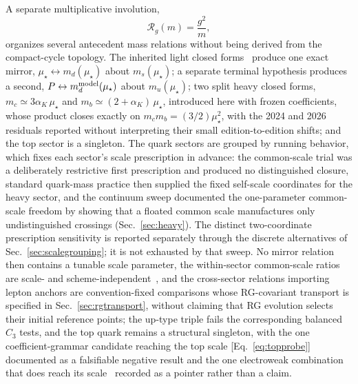 \documentclass[aps,twocolumn,superscriptaddress,nofootinbib,floatfix]{revtex4-2}
\newcommand{\mstar}{\mu_\star}
\newcommand{\alphaK}{\alpha_K}
\newcommand{\RR}{\mathcal R}
\begin{document}
A separate multiplicative involution,
\begin{equation}
\RR_g(m)=\frac{g^2}{m},
\end{equation}
organizes several antecedent mass relations without being derived from the compact-cycle topology. The inherited light closed forms~\cite{BrilliantMPLA} produce one exact mirror, $\mstar\leftrightarrow m_d(\mstar)$ about $m_s(\mstar)$; a separate terminal hypothesis produces a second, $P\leftrightarrow m_d^{\rm model}(\mstar)$ about $m_u(\mstar)$; two split heavy closed forms, $m_c\simeq3\alphaK\,\mstar$ and $m_b\simeq(2+\alphaK)\,\mstar$, introduced here with frozen coefficients, whose product closes exactly on $m_cm_b=(3/2)\mstar^2$, with the 2024 and 2026 residuals reported without interpreting their small edition-to-edition shifts; and the top sector is a singleton. The quark sectors are grouped by running behavior, which fixes each sector's scale prescription in advance: the common-scale trial was a deliberately restrictive first prescription and produced no distinguished closure, standard quark-mass practice then supplied the fixed self-scale coordinates for the heavy sector, and the continuum sweep documented the one-parameter common-scale freedom by showing that a floated common scale manufactures only undistinguished crossings (Sec.~\ref{sec:heavy}). The distinct two-coordinate prescription sensitivity is reported separately through the discrete alternatives of Sec.~\ref{sec:scalegrouping}; it is not exhausted by that sweep. No mirror relation then contains a tunable scale parameter, the within-sector common-scale ratios are scale- and scheme-independent~\cite{GasserLeutwyler1982,PDG2026}, and the cross-sector relations importing lepton anchors are convention-fixed comparisons whose RG-covariant transport is specified in Sec.~\ref{sec:rgtransport}, without claiming that RG evolution selects their initial reference points; the up-type triple fails the corresponding balanced $C_3$ tests, and the top quark remains a structural singleton, with the one coefficient-grammar candidate reaching the top scale [Eq.~\eqref{eq:topprobe}] documented as a falsifiable negative result and the one electroweak combination that does reach its scale~\cite{TorrenteLujan2014} recorded as a pointer rather than a claim.
\end{document}
